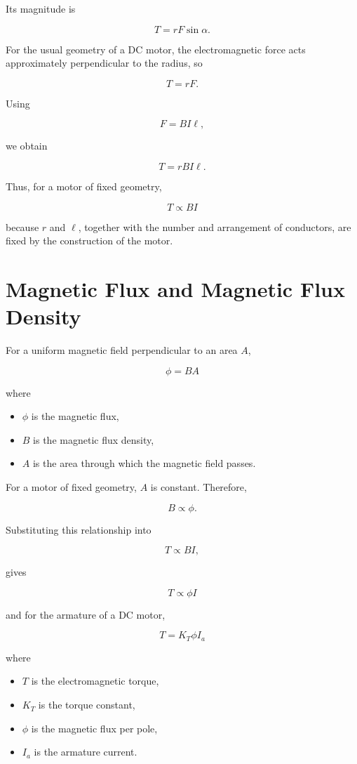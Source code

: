 \documentclass[11pt,a4paper]{article}
\begin{document}
Its magnitude is

\[
T = rF\sin\alpha.
\]

For the usual geometry of a DC motor, the electromagnetic force acts
approximately perpendicular to the radius, so

\[
T = rF.
\]

Using

\[
F = BI\ell,
\]

we obtain

\[
T = rBI\ell.
\]

Thus, for a motor of fixed geometry,

\[
\boxed{
T \propto BI
}
\]

because $r$ and $\ell$, together with the number and arrangement of
conductors, are fixed by the construction of the motor.

\section{Magnetic Flux and Magnetic Flux Density}

For a uniform magnetic field perpendicular to an area $A$,

\[
\boxed{
\phi = BA
}
\]

where

\begin{itemize}
    \item $\phi$ is the magnetic flux,
    \item $B$ is the magnetic flux density,
    \item $A$ is the area through which the magnetic field passes.
\end{itemize}

For a motor of fixed geometry, $A$ is constant. Therefore,

\[
B \propto \phi.
\]

Substituting this relationship into

\[
T \propto BI,
\]

gives

\[
\boxed{
T \propto \phi I
}
\]

and for the armature of a DC motor,

\[
\boxed{
T = K_T \phi I_a
}
\]

where

\begin{itemize}
    \item $T$ is the electromagnetic torque,
    \item $K_T$ is the torque constant,
    \item $\phi$ is the magnetic flux per pole,
    \item $I_a$ is the armature current.
\end{itemize}
\end{document}
